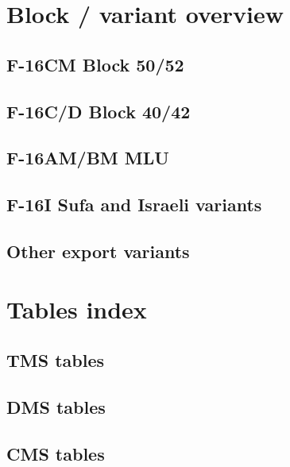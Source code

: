 \documentclass[11pt, a4paper, twoside]{report}
\begin{document}
\appendix

\section{Block / variant overview}

\subsection{F-16CM Block 50/52}

\subsection{F-16C/D Block 40/42}

\subsection{F-16AM/BM MLU}

\subsection{F-16I Sufa and Israeli variants}

\subsection{Other export variants}

\section{Tables index}

\subsection{TMS tables}

\subsection{DMS tables}

\subsection{CMS tables}
\end{document}
